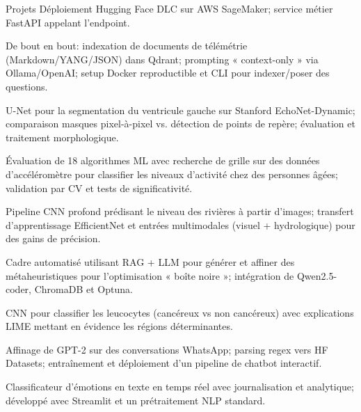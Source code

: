 \begin{rubricnorepeat}{Projets}
Déploiement Hugging Face DLC sur AWS SageMaker; service métier FastAPI appelant l’endpoint.\hfill \href{https://github.com/musel25/sagemaker-inference-microservice}{\faGithub}


De bout en bout: indexation de documents de télémétrie (Markdown/YANG/JSON) dans Qdrant; prompting « context-only » via Ollama/OpenAI; setup Docker reproductible et CLI pour indexer/poser des questions.\hfill 
\href{https://github.com/musel25/telemetry-rag}{\faGithub}

U-Net pour la segmentation du ventricule gauche sur Stanford EchoNet-Dynamic; comparaison masques pixel-à-pixel vs. détection de points de repère; évaluation et traitement morphologique.\hfill\href{https://github.com/Tec-AI-23/EchoNetDynamic}{\faGithub}

Évaluation de 18 algorithmes ML avec recherche de grille sur des données d’accéléromètre pour classifier les niveaux d’activité chez des personnes âgées; validation par CV et tests de significativité.\hfill \href{https://github.com/Tec-AI-23/HAR70}{\faGithub}

Pipeline CNN profond prédisant le niveau des rivières à partir d’images; transfert d’apprentissage EfficientNet et entrées multimodales (visuel + hydrologique) pour des gains de précision.\hfill \href{https://github.com/musel25/research_deep_learning}{\faGithub}

Cadre automatisé utilisant RAG + LLM pour générer et affiner des métaheuristiques pour l’optimisation « boîte noire »; intégration de Qwen2.5-coder, ChromaDB et Optuna.\hfill \href{https://github.com/musel25/llm-metaheuristics}{\faGithub}

CNN pour classifier les leucocytes (cancéreux vs non cancéreux) avec explications LIME mettant en évidence les régions déterminantes. 

Affinage de GPT-2 sur des conversations WhatsApp; parsing regex vers HF Datasets; entraînement et déploiement d’un pipeline de chatbot interactif.\hfill \href{https://github.com/musel25/her_if_it_was_2025}{\faGithub}

Classificateur d’émotions en texte en temps réel avec journalisation et analytique; développé avec Streamlit et un prétraitement NLP standard.\hfill \href{https://github.com/musel25/nlp_project}{\faGithub}

\end{rubricnorepeat}

